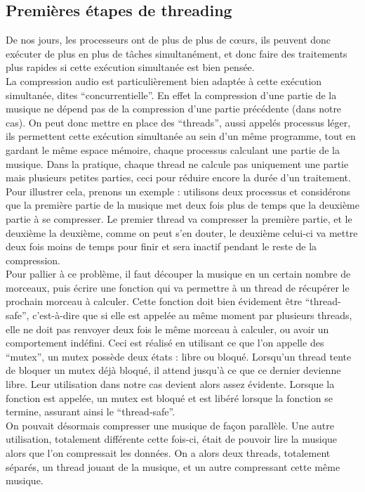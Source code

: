 \documentclass[a4paper,12pt]{article}
\begin{document}
	\subsection{Premières étapes de threading}
De nos jours, les processeurs ont de plus de plus de cœurs, ils peuvent donc
exécuter de plus en plus de tâches simultanément, et donc faire des traitements
plus rapides si cette exécution simultanée est bien pensée.\\
La compression audio est particulièrement bien adaptée à cette exécution
simultanée, dites ``concurrentielle''. En effet la compression d'une partie de
la musique ne dépend pas de la compression d'une partie précédente (dans notre cas).
On peut donc mettre en place des ``threads'', aussi appelés processus léger,  ils  permettent cette
exécution simultanée au sein d'un même programme, tout en gardant le même espace
mémoire, chaque processus calculant une
partie de la musique. Dans la pratique, chaque thread ne calcule pas uniquement une
partie mais plusieurs petites parties, ceci pour réduire encore la durée d'un
traitement.  Pour illustrer cela, prenons un exemple : utilisons deux processus et
considérons que la première partie de la musique met deux fois plus de temps que
la deuxième partie à se compresser. Le premier thread va compresser la première partie, et le
deuxième la deuxième, comme on peut s'en douter, le deuxième celui-ci va  mettre deux
fois moins de temps pour finir et sera inactif pendant le reste de la
compression.\\
Pour pallier à ce problème, il faut découper la musique en un certain nombre de
morceaux, puis écrire une fonction qui va permettre à un thread de récupérer le
prochain morceau à calculer. Cette fonction doit bien évidement être
``thread-safe'', c'est-à-dire que si elle est appelée au même moment par
plusieurs threads, elle ne doit pas renvoyer deux fois le même morceau à
calculer, ou avoir un comportement indéfini. Ceci est réalisé en utilisant ce
que l'on appelle des ``mutex'', un mutex possède deux états : libre ou bloqué.
Lorsqu'un thread tente de bloquer un mutex déjà bloqué, il attend jusqu'à ce que
ce dernier devienne libre. Leur utilisation dans notre cas devient alors assez
évidente. Lorsque la fonction est appelée, un mutex est bloqué et est libéré
lorsque la fonction se termine, assurant ainsi le ``thread-safe''.\\
On pouvait désormais compresser une musique de façon parallèle. Une autre
utilisation, totalement différente cette fois-ci, était de pouvoir lire la
musique alors que l'on compressait les données. On a alors deux threads,
totalement séparés, un thread jouant de la musique, et un autre compressant
cette même musique.\\
\end{document}
